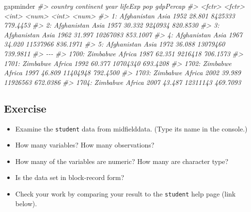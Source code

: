 \documentclass[
]{book}
\newenvironment{Shaded}{\begin{snugshade}}{\end{snugshade}}
\newcommand{\CommentTok}[1]{\textcolor[rgb]{0.56,0.35,0.01}{\textit{#1}}}
\newcommand{\NormalTok}[1]{#1}
\providecommand{\tightlist}{%
  \setlength{\itemsep}{0pt}\setlength{\parskip}{0pt}}
\begin{document}
\begin{Shaded}
\begin{Highlighting}[]
\NormalTok{gapminder}
\CommentTok{\#\textgreater{}           country continent  year lifeExp      pop gdpPercap}
\CommentTok{\#\textgreater{}            \textless{}fctr\textgreater{}    \textless{}fctr\textgreater{} \textless{}int\textgreater{}   \textless{}num\textgreater{}    \textless{}int\textgreater{}     \textless{}num\textgreater{}}
\CommentTok{\#\textgreater{}    1: Afghanistan      Asia  1952  28.801  8425333  779.4453}
\CommentTok{\#\textgreater{}    2: Afghanistan      Asia  1957  30.332  9240934  820.8530}
\CommentTok{\#\textgreater{}    3: Afghanistan      Asia  1962  31.997 10267083  853.1007}
\CommentTok{\#\textgreater{}    4: Afghanistan      Asia  1967  34.020 11537966  836.1971}
\CommentTok{\#\textgreater{}    5: Afghanistan      Asia  1972  36.088 13079460  739.9811}
\CommentTok{\#\textgreater{}   {-}{-}{-}                                                       }
\CommentTok{\#\textgreater{} 1700:    Zimbabwe    Africa  1987  62.351  9216418  706.1573}
\CommentTok{\#\textgreater{} 1701:    Zimbabwe    Africa  1992  60.377 10704340  693.4208}
\CommentTok{\#\textgreater{} 1702:    Zimbabwe    Africa  1997  46.809 11404948  792.4500}
\CommentTok{\#\textgreater{} 1703:    Zimbabwe    Africa  2002  39.989 11926563  672.0386}
\CommentTok{\#\textgreater{} 1704:    Zimbabwe    Africa  2007  43.487 12311143  469.7093}
\end{Highlighting}
\end{Shaded}

\hypertarget{exercise}{%
\subsection{Exercise}\label{exercise}}

\begin{itemize}
\tightlist
\item
  Examine the \texttt{student} data from midfielddata. (Type its name in the console.)
\item
  How many variables? How many observations?
\item
  How many of the variables are numeric? How many are character type?
\item
  Is the data set in block-record form?
\item
  Check your work by comparing your result to the \texttt{student} help page (link below).
\end{itemize}
\end{document}
